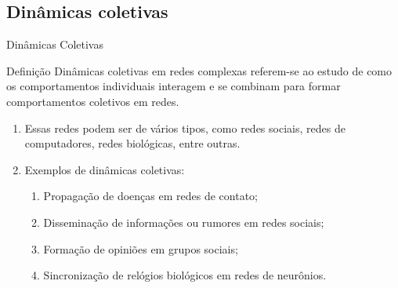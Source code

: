 \documentclass{templatebeamerufc/libs/ufc_format}
\begin{document}
\subsection{Dinâmicas coletivas}
\begin{frame}{Dinâmicas Coletivas}
  \begin{block}{Definição}
    Dinâmicas coletivas em redes complexas referem-se ao estudo de
como os comportamentos individuais interagem e se combinam para formar
comportamentos coletivos em redes.
  \end{block}
  \begin{enumerate}
\item Essas redes podem ser de vários tipos, como redes sociais, redes
de computadores, redes biológicas, entre outras.
\item Exemplos de dinâmicas coletivas:
  \begin{enumerate}
  \item Propagação de doenças em redes de contato;
  \item Disseminação de informações ou rumores em redes sociais;
  \item Formação de opiniões em grupos sociais;
  \item Sincronização de relógios biológicos em redes de neurônios.
  \end{enumerate}
\end{enumerate}
\end{frame}
\end{document}
